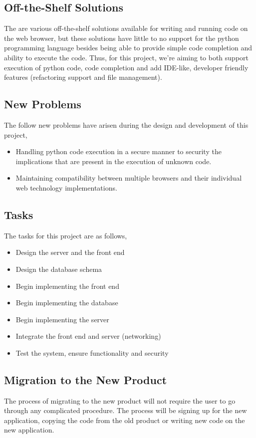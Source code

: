 \documentclass[12pt, titlepage]{article}
\begin{document}
  \subsection{Off-the-Shelf Solutions}
  The are various off-the-shelf solutions available for writing and running
  code on the web browser, but these solutions have little to no support for
  the python programming language besides being able to provide simple code
  completion and ability to execute the code. Thus, for this project, we're
	aiming to both support execution of python code, code completion and add
	IDE-like, developer friendly features (refactoring support and file
	management).

  \subsection{New Problems}
	The follow new problems have arisen during the design and development of this
	project,
	\begin{itemize}
		\item Handling python code execution in a secure manner to security
            the implications that are present in the execution of unknown code.
		\item Maintaining compatibility between multiple browsers and their
			individual web technology implementations.
	\end{itemize}

  \subsection{Tasks}
	The tasks for this project are as follows,
	\begin{itemize}
		\item Design the server and the front end
		\item Design the database schema
		\item Begin implementing the front end
		\item Begin implementing the database
		\item Begin implementing the server
		\item Integrate the front end and server (networking)
		\item Test the system, ensure functionality and security
	\end{itemize}

  \subsection{Migration to the New Product}
	The process of migrating to the new product will not require the user to go
	through any complicated procedure. The process will be signing up for the new
	application, copying the code from the old product or writing new code on the
	new application.
\end{document}
